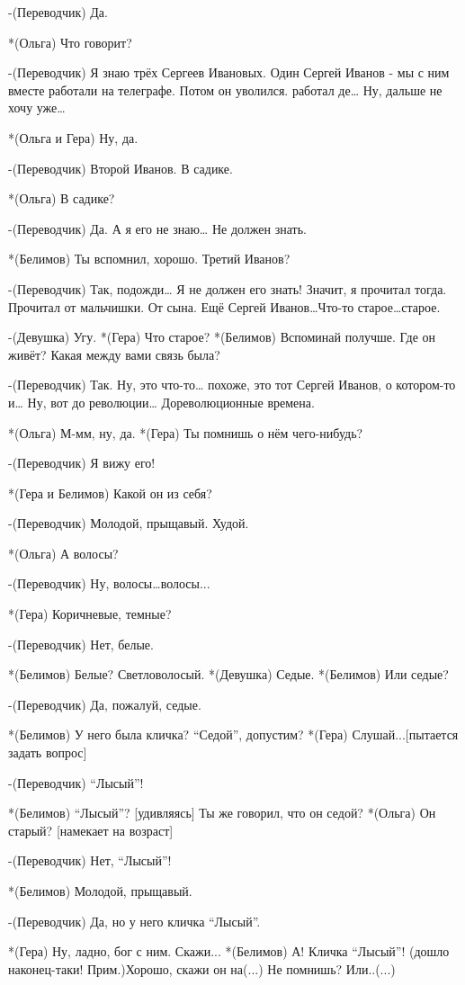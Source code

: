 -(Переводчик) Да.

*(Ольга) Что говорит?

-(Переводчик) Я знаю трёх Сергеев Ивановых. Один Сергей Иванов - мы с ним вместе работали на телеграфе. Потом он уволился. работал де… Ну, дальше не хочу уже…

*(Ольга и Гера) Ну, да.

-(Переводчик) Второй Иванов. В садике.

*(Ольга) В садике?

-(Переводчик) Да. А я его не знаю… Не должен знать.

*(Белимов) Ты вспомнил, хорошо. Третий Иванов?

-(Переводчик) Так, подожди… Я не должен его знать! Значит, я прочитал тогда. Прочитал от мальчишки. От сына.  Ещё Сергей Иванов…Что-то старое…старое. 

-(Девушка) Угу.
*(Гера) Что  старое?
*(Белимов) Вспоминай получше. Где он живёт? Какая между вами связь была?

-(Переводчик) Так. Ну, это что-то… похоже, это тот Сергей Иванов, о котором-то и… Ну, вот до революции… Дореволюционные времена. 

*(Ольга) М-мм, ну, да.
*(Гера) Ты помнишь о нём чего-нибудь?

-(Переводчик) Я вижу его!

*(Гера и Белимов) Какой он из себя?

-(Переводчик) Молодой, прыщавый. Худой.

*(Ольга) А волосы?

-(Переводчик) Ну, волосы…волосы... 

*(Гера) Коричневые, темные?


-(Переводчик) Нет, белые.

*(Белимов) Белые? Светловолосый.
*(Девушка) Седые.
*(Белимов) Или седые?

-(Переводчик) Да, пожалуй, седые.

*(Белимов) У него была кличка? “Седой”, допустим?
*(Гера) Слушай...[пытается задать вопрос]

-(Переводчик) “Лысый”!

*(Белимов) “Лысый”? [удивляясь] Ты же говорил, что он седой?
*(Ольга) Он старый? [намекает на возраст]

-(Переводчик) Нет, “Лысый”! 

*(Белимов) Молодой, прыщавый.

-(Переводчик) Да, но у него кличка “Лысый”.

*(Гера) Ну, ладно, бог с ним. Скажи...
*(Белимов) А! Кличка “Лысый”! (дошло наконец-таки! Прим.)Хорошо, скажи он на(...) Не помнишь?  Или..(...)

